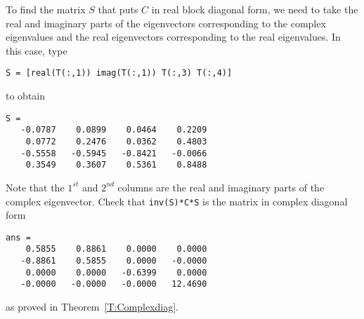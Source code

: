 \documentclass{ximera}
\begin{document}
To find the matrix $S$ that puts $C$ in real block diagonal form, we
need to take the real and imaginary parts of the eigenvectors 
corresponding to the complex eigenvalues and the real eigenvectors 
corresponding to the real eigenvalues.  In this case, type
{\small
\begin{verbatim}
S = [real(T(:,1)) imag(T(:,1)) T(:,3) T(:,4)]
\end{verbatim}
}
to obtain 
\begin{verbatim}
S =
   -0.0787    0.0899    0.0464    0.2209
    0.0772    0.2476    0.0362    0.4803
   -0.5558   -0.5945   -0.8421   -0.0066
    0.3549    0.3607    0.5361    0.8488
\end{verbatim} 
Note that the $1^{st}$ and $2^{nd}$ columns are the real and 
imaginary parts of the complex eigenvector.  Check that 
{\tt inv(S)*C*S} is the matrix in complex diagonal form
\begin{verbatim}
ans = 
    0.5855    0.8861    0.0000    0.0000
   -0.8861    0.5855    0.0000   -0.0000
    0.0000    0.0000   -0.6399    0.0000
   -0.0000   -0.0000   -0.0000   12.4690
\end{verbatim}
as proved in Theorem~\ref{T:Complexdiag}.





\end{document}
